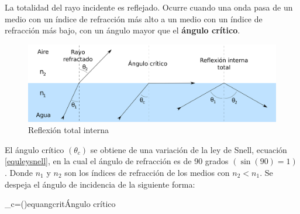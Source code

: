 La totalidad del rayo incidente es reflejado. Ocurre cuando una onda pasa de un medio con un índice de refracción más alto a un medio con un índice de refracción más bajo, con un ángulo mayor que el \textbf{ángulo crítico}.

\begin{figure}[H]
  \centering
  \includegraphics[scale=0.2]{imagenes/reflexion_total_interna.png}
  \caption{Reflexión total interna\cite{wikireftotint}}
\end{figure}

El ángulo crítico $(\theta_c)$ se obtiene de una variación de la ley de Snell, ecuación \ref{equleysnell}, en la cual el ángulo de refracción es de 90 grados $(\sin(90)=1)$. Donde $n_1$ y $n_2$ son los índices de refracción de los medios con $n_2 < n_1$. Se despeja el ángulo de incidencia de la siguiente forma:

\begin{listequbox}
  {\theta_c=\arcsin\left(\right)}{equangcrit}{Ángulo crítico}
\end{listequbox}
